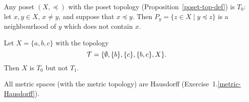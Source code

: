 \begin{example}
  Any poset $(X,\preceq)$ with the poset topology (Proposition~\ref{poset-top-def}) is $T_0$: let $x,y \in X$, $x \not= y$, and suppose that $x \preceq y$. Then $P_y = \{ z \in X \mid y \preceq z\}$ is a neighbourhood of $y$ which does not contain $x$.
\end{example}
\begin{example}
  Let $X = \{a,b,c\}$ with the topology
  \[
    \mathcal{T} = \{ \emptyset, \{b\}, \{c\}, \{b,c\}, X \}.
  \]
  Then $X$ is $T_0$ but not $T_1$.
\end{example}
\begin{example}
  All metric spaces (with the metric topology) are Hausdorff (Exercise~1.\ref{metric-Hausdorff}).
\end{example}
